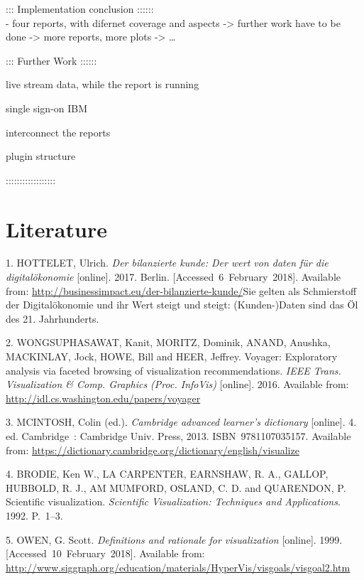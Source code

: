 \documentclass[american,a4paper,oneside,,tablecaptionabove]{scrbook}
\begin{document}
::: Implementation conclusion ::::::\\
- four reports, with difernet coverage and aspects -\textgreater{}
further work have to be done -\textgreater{} more reports, more plots
-\textgreater{} \ldots{}

::: Further Work ::::::

live stream data, while the report is running

single sign-on IBM

interconnect the reports

plugin structure

::::::::::::::::::

\chapter*{Literature}\label{bibliography}

\hypertarget{refs}{}
\hypertarget{ref-Hottelet.2017}{}
1. HOTTELET, Ulrich. \emph{Der bilanzierte kunde: Der wert von daten für
die digitalökonomie} {[}online{]}. 2017. Berlin.
{[}Accessed~6~February~2018{]}. Available from:
\url{http://businessimpact.eu/der-bilanzierte-kunde/}Sie gelten als
Schmierstoff der Digitalökonomie und ihr Wert steigt und steigt:
(Kunden-)Daten sind das Öl des 21. Jahrhunderts.

\hypertarget{ref-Wongsuphasawat.2016}{}
2. WONGSUPHASAWAT, Kanit, MORITZ, Dominik, ANAND, Anushka, MACKINLAY,
Jock, HOWE, Bill and HEER, Jeffrey. Voyager: Exploratory analysis via
faceted browsing of visualization recommendations. \emph{IEEE Trans.
Visualization \& Comp. Graphics (Proc. InfoVis)} {[}online{]}. 2016.
Available from: \url{http://idl.cs.washington.edu/papers/voyager}

\hypertarget{ref-McIntosh.2013}{}
3. MCINTOSH, Colin (ed.). \emph{Cambridge advanced learner's dictionary}
{[}online{]}. 4. ed. Cambridge~: Cambridge Univ. Press, 2013.
ISBN~9781107035157. Available from:
\url{https://dictionary.cambridge.org/dictionary/english/visualize}

\hypertarget{ref-Earnshaw.1992}{}
4. BRODIE, Ken W., LA CARPENTER, EARNSHAW, R. A., GALLOP, HUBBOLD, R.
J., AM MUMFORD, OSLAND, C. D. and QUARENDON, P. Scientific
visualization. \emph{Scientific Visualization: Techniques and
Applications}. 1992. P.~1--3.

\hypertarget{ref-Owen.1999}{}
5. OWEN, G. Scott. \emph{Definitions and rationale for visualization}
{[}online{]}. 1999. {[}Accessed~10~February~2018{]}. Available from:
\url{http://www.siggraph.org/education/materials/HyperVis/visgoals/visgoal2.htm}
\end{document}
